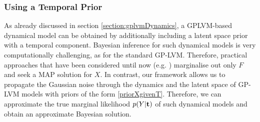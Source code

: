 \subsubsection{\label{temporalPrior} Using a Temporal Prior}

As already discussed in section \ref{section:gplvmDynamics}, a GPLVM-based dynamical model can be obtained by
additionally including a latent space prior with a temporal component. 
Bayesian inference for such dynamical models is very computationally challenging, as for the standard GP-LVM.
Therefore, practical approaches that have been considered until now
(e.g. \cite{hgplvm, GPDM}) marginalise out only $F$ and seek a MAP solution for $X$.
%
In contrast, our framework allows us to propagate the Gaussian noise through the dynamics
and the latent space of GP-LVM  models with priors of
the form \eqref{priorXgivenT}. 
Therefore, we can approximate the true marginal likelihood $p(Y|\mathbf{t})$ of such dynamical models and
obtain an approximate Bayesian solution. 

%



